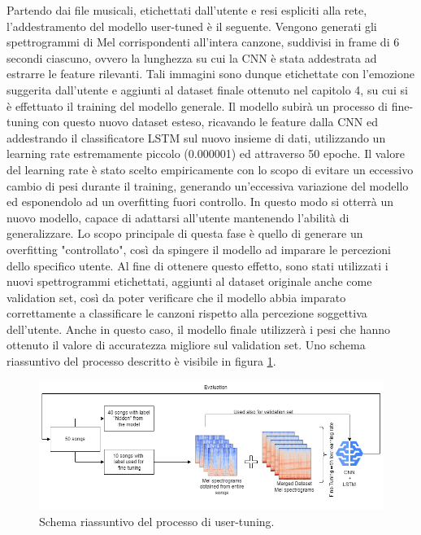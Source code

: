 \documentclass[11pt]{report}
\begin{document}
Partendo dai file musicali, etichettati dall'utente e resi espliciti alla rete, l'addestramento del modello user-tuned è il seguente. Vengono generati gli spettrogrammi di Mel corrispondenti all'intera canzone, suddivisi in frame di 6 secondi ciascuno, ovvero la lunghezza su cui la CNN è stata addestrata ad estrarre le feature rilevanti. Tali immagini sono dunque etichettate con l'emozione suggerita dall'utente e aggiunti al dataset finale ottenuto nel capitolo 4, su cui si è effettuato il training del modello generale. Il modello subirà un processo di fine-tuning con questo nuovo dataset esteso, ricavando le feature dalla CNN ed addestrando il classificatore LSTM sul nuovo insieme di dati, utilizzando un learning rate estremamente piccolo (0.000001) ed attraverso 50 epoche. Il valore del learning rate è stato scelto empiricamente con lo scopo di evitare un eccessivo cambio di pesi durante il training, generando un'eccessiva variazione del modello ed esponendolo ad un overfitting fuori controllo. In questo modo si otterrà un nuovo modello, capace di adattarsi all'utente mantenendo l'abilità di generalizzare. Lo scopo principale di questa fase è quello di generare un overfitting "controllato", così da spingere il modello ad imparare le percezioni dello specifico utente. Al fine di ottenere questo effetto, sono stati utilizzati i nuovi spettrogrammi etichettati, aggiunti al dataset originale anche come validation set, così da poter verificare che il modello abbia imparato correttamente a classificare le canzoni rispetto alla percezione soggettiva dell'utente. Anche in questo caso, il modello finale utilizzerà i pesi che hanno ottenuto il valore di accuratezza migliore sul validation set. Uno schema riassuntivo del processo descritto è visibile in figura \ref{fig:summary-user-tuning}.

\vspace{1cm}

\begin{figure}[h]
\centering
\includegraphics[scale = 0.55]{img/finetuning-process.png}
\caption{Schema riassuntivo del processo di user-tuning.}
\label{fig:summary-user-tuning}
\end{figure}
\end{document}
